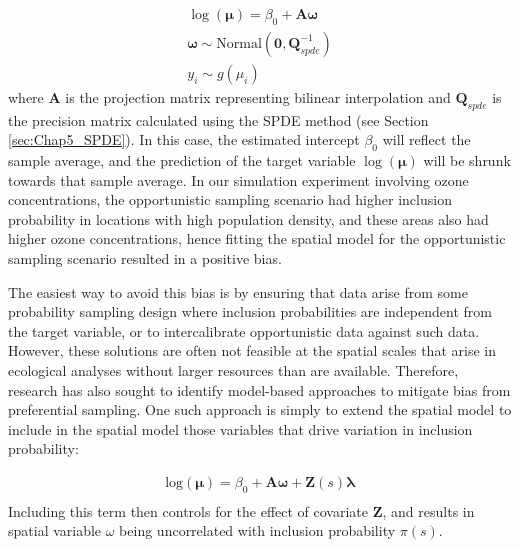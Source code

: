 \begin{equation} 
\begin{gathered}
    \log(\mathbf{\mu}) = \beta_0 + \mathbf{A \omega}  \\
    \mathbf{\omega} \sim \mathrm{Normal}( \mathbf{0, Q}_{spde}^{-1} ) \\
    y_i \sim g( \mu_i )
\end{gathered} 
\end{equation}
where \(\mathbf{A}\) is the projection matrix representing bilinear interpolation and \(\mathbf{Q}_{spde}\) is the precision matrix calculated using the SPDE method (see Section \ref{sec:Chap5_SPDE}).  In this case, the estimated intercept \( \beta_0 \) will reflect the sample average, and the prediction of the target variable \( \log(\mathbf{\mu}) \) will be shrunk towards that sample average. In our simulation experiment involving ozone concentrations, the opportunistic sampling scenario had higher inclusion probability in locations with high population density, and these areas also had higher ozone concentrations, hence fitting the spatial model for the opportunistic sampling scenario resulted in a positive bias.  

The easiest way to avoid this bias is by ensuring that data arise from some probability sampling design where inclusion probabilities are independent from the target variable, or to intercalibrate opportunistic data against such data.  However, these solutions are often not feasible at the spatial scales that arise in ecological analyses without larger resources than are available.  Therefore, research has also sought to identify model-based approaches to mitigate bias from preferential sampling.  One such approach is simply to extend the spatial model to include in the spatial model those variables that drive variation in inclusion probability:

\begin{equation} 
\begin{gathered}
    \mathrm {log}(\mathbf{\mu}) = \beta_0 + \mathbf{A \omega} + \mathbf Z(s) \mathbf \lambda  \\
\end{gathered} 
\end{equation}
Including this term then controls for the effect of covariate \(\mathbf Z\), and results in spatial variable \(\omega\) being uncorrelated with inclusion probability \(\pi(s)\).  

